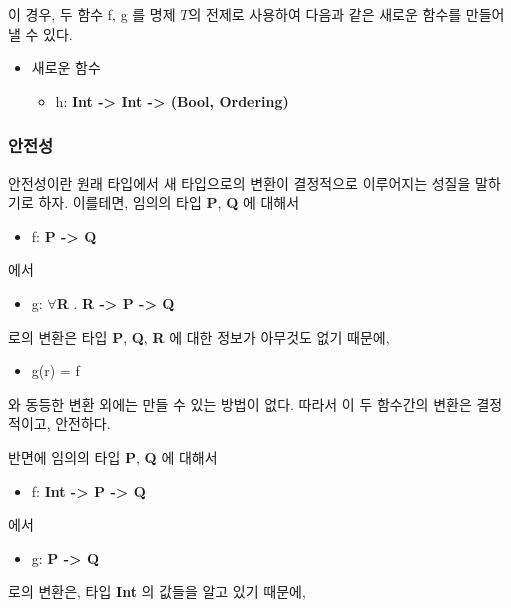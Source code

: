 \documentclass[a4paper, 12pt]{oblivoir}
\newcommand{\texttype}[1]{{\bfseries\ttfamily#1}}
\begin{document}
이 경우, 두 함수 f, g 를 명제 $T$의 전제로 사용하여 다음과 같은 새로운 함수를 만들어낼 수 있다.

\begin{itemize}[noitemsep]
  \small
\item 새로운 함수
  \begin{itemize}
  \item h: \texttype{Int -> Int -> (Bool, Ordering)}
  \end{itemize}
\end{itemize}

\subsubsection{안전성}
안전성이란 원래 타입에서 새 타입으로의 변환이 결정적으로 이루어지는 성질을 말하기로 하자.
이를테면, 임의의 타입 \texttype{P}, \texttype{Q} 에 대해서

\begin{itemize}[noitemsep]
\item f: \texttype{P -> Q}
\end{itemize}

에서

\begin{itemize}[noitemsep]
\item g: $\forall{}$\texttype{R} . \texttype{R -> P -> Q}
\end{itemize}

로의 변환은 타입 \texttype{P}, \texttype{Q}, \texttype{R} 에 대한 정보가 아무것도 없기 때문에,

\begin{itemize}[noitemsep]
\item g(r) = f 
\end{itemize}

와 동등한 변환 외에는 만들 수 있는 방법이 없다.
따라서 이 두 함수간의 변환은 결정적이고, 안전하다.

반면에 임의의 타입 \texttype{P}, \texttype{Q} 에 대해서

\begin{itemize}[noitemsep]
\item f: \texttype{Int -> P -> Q}
\end{itemize}

에서

\begin{itemize}[noitemsep]
\item g: \texttype{P -> Q}
\end{itemize}

로의 변환은, 타입 \texttype{Int} 의 값들을 알고 있기 때문에,
\end{document}
